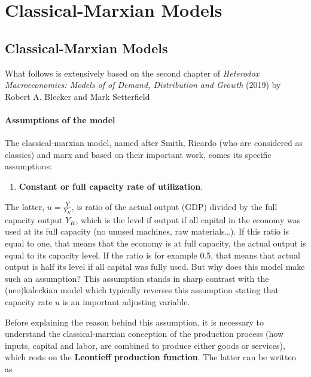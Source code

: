 \documentclass[
  letterpaper,
  DIV=11,
  numbers=noendperiod]{scrreprt}
\providecommand{\tightlist}{%
  \setlength{\itemsep}{0pt}\setlength{\parskip}{0pt}}\usepackage{longtable,booktabs,array}
\begin{document}
\part{Classical-Marxian Models}

\hypertarget{classical-marxian-models-1}{%
\chapter{Classical-Marxian Models}\label{classical-marxian-models-1}}

What follows is extensively based on the second chapter of
\emph{Heterodox Macroeconomics: Models of of Demand, Distribution and
Growth} (2019) by Robert A. Blecker and Mark Setterfield

\hypertarget{assumptions-of-the-model}{%
\subsection{Assumptions of the model}\label{assumptions-of-the-model}}

The classical-marxian model, named after Smith, Ricardo (who are
considered as classics) and marx and based on their important work,
comes its specific assumptions:

\begin{enumerate}
\def\labelenumi{\arabic{enumi}.}
\tightlist
\item
  \textbf{Constant or full capacity rate of utilization}.
\end{enumerate}

The latter, \(u = \frac{Y}{Y_{K}}\), is ratio of the actual output (GDP)
divided by the full capacity output \(Y_K\), which is the level if
output if all capital in the economy was used at its full capacity (no
unused machines, raw materials\ldots). If this ratio is equal to one,
that means that the economy is at full capacity, the actual output is
equal to its capacity level. If the ratio is for example 0.5, that means
that actual output is half its level if all capital was fully used. But
why does this model make such an assumption? This assumption stands in
sharp contrast with the (neo)kaleckian model which typically reverses
this assumption stating that capacity rate \(u\) is an important
adjusting variable.

Before explaining the reason behind this assumption, it is necessary to
understand the classical-marxian conception of the production process
(how inputs, capital and labor, are combined to produce either goods or
services), which rests on the \textbf{Leontieff production function}.
The latter can be written as
\end{document}
